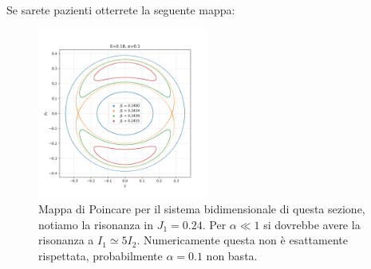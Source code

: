 Se sarete pazienti otterrete la seguente mappa:
\begin{figure}[H]
    \centering
    \includegraphics[width=0.5\textwidth]{figures/18_H22.png}
    \caption{\scriptsize Mappa di Poincare per il sistema bidimensionale di questa sezione, notiamo la risonanza in $J_1 = 0.24$. Per $\alpha\ll 1$ si dovrebbe avere la risonanza a $I_1\simeq 5I_2$. Numericamente questa non è esattamente rispettata, probabilmente $\alpha=0.1$ non basta.}
    \label{fig:figures-18_H22-png}
\end{figure}

